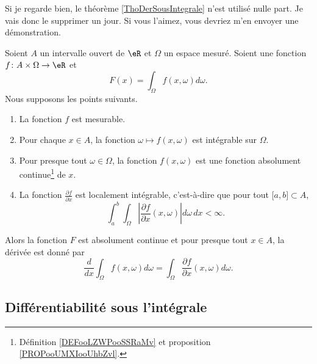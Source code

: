 \begin{probleme}		\label{PROBooGVWHooOTNJFe}
	Si je regarde bien, le théorème \ref{ThoDerSousIntegrale} n'est utilisé nulle part. Je vais donc le supprimer un jour. Si vous l'aimez, vous devriez m'en envoyer une démonstration.
\end{probleme}


\begin{theorem}     \label{ThoDerSousIntegrale}
	Soient \( A\) un intervalle ouvert de \( \eR\) et \( \Omega\) un espace mesuré. Soient une fonction \( f\colon A\times \Omega\to \eR\) et
	\begin{equation}
		F(x)=\int_{\Omega}f(x,\omega)d\omega.
	\end{equation}
	Nous supposons les points suivants.
	\begin{enumerate}
		\item
		      La fonction \( f\) est mesurable.
		\item
		      Pour chaque \( x\in A\), la fonction  \( \omega\mapsto f(x,\omega)\) est intégrable sur \( \Omega\).
		\item
		      Pour presque tout \( \omega\in\Omega\), la fonction \( f(x,\omega)\) est une fonction absolument continue\footnote{Définition \ref{DEFooLZWPooSSRaMv} et proposition \ref{PROPooUMXIooUhbZvl}.} de \( x\).
		\item
		      La fonction \( \frac{ \partial f }{ \partial x }\) est localement intégrable, c'est-à-dire que pour tout \( \mathopen[ a , b \mathclose]\subset A\),
		      \begin{equation}
			      \int_a^b\int_{\Omega}\left| \frac{ \partial f }{ \partial x }(x,\omega) \right| d\omega\,dx<\infty.
		      \end{equation}
	\end{enumerate}
	Alors la fonction \( F\) est absolument continue et pour presque tout \( x\in A\), la dérivée est donné par
	\begin{equation}
		\frac{ d }{ dx }\int_{\Omega}f(x,\omega)d\omega=\int_{\Omega}\frac{ \partial f }{ \partial x }(x,\omega)d\omega.
	\end{equation}
\end{theorem}

\ssdem

\subsection{Différentiabilité sous l'intégrale}


